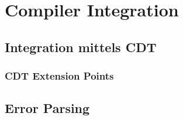 \chapter{Compiler Integration}

\section{Integration mittels CDT}

\subsection{CDT Extension Points}

\section{Error Parsing}

